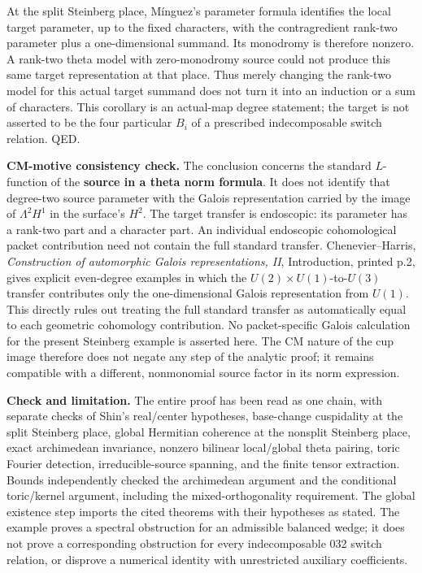 \documentclass[11pt,a4paper]{article}
\theoremstyle{definition}
\begin{document}
At the split Steinberg place, Mínguez's parameter formula identifies the local target parameter, up to the fixed characters, with the contragredient rank-two parameter plus a one-dimensional summand. Its monodromy is therefore nonzero. A rank-two theta model with zero-monodromy source could not produce this same target representation at that place. Thus merely changing the rank-two model for this actual target summand does not turn it into an induction or a sum of characters. This corollary is an actual-map degree statement; the target is not asserted to be the four particular \(B_i\) of a prescribed indecomposable switch relation. QED.

\textbf{CM-motive consistency check.} The conclusion concerns the standard \(L\)-function of the \textbf{source in a theta norm formula}. It does not identify that degree-two source parameter with the Galois representation carried by the image of \(\Lambda^2H^1\) in the surface's \(H^2\). The target transfer is endoscopic: its parameter has a rank-two part and a character part. An individual endoscopic cohomological packet contribution need not contain the full standard transfer. Chenevier--Harris, \emph{Construction of automorphic Galois representations, II}, Introduction, printed p.2, gives explicit even-degree examples in which the \(U(2)\times U(1)\)-to-\(U(3)\) transfer contributes only the one-dimensional Galois representation from \(U(1)\). This directly rules out treating the full standard transfer as automatically equal to each geometric cohomology contribution. No packet-specific Galois calculation for the present Steinberg example is asserted here. The CM nature of the cup image therefore does not negate any step of the analytic proof; it remains compatible with a different, nonmonomial source factor in its norm expression.

\textbf{Check and limitation.} The entire proof has been read as one chain, with separate checks of Shin's real/center hypotheses, base-change cuspidality at the split Steinberg place, global Hermitian coherence at the nonsplit Steinberg place, exact archimedean invariance, nonzero bilinear local/global theta pairing, toric Fourier detection, irreducible-source spanning, and the finite tensor extraction. Bounds independently checked the archimedean argument and the conditional toric/kernel argument, including the mixed-orthogonality requirement. The global existence step imports the cited theorems with their hypotheses as stated. The example proves a spectral obstruction for an admissible balanced wedge; it does not prove a corresponding obstruction for every indecomposable 032 switch relation, or disprove a numerical identity with unrestricted auxiliary coefficients.
\end{document}
